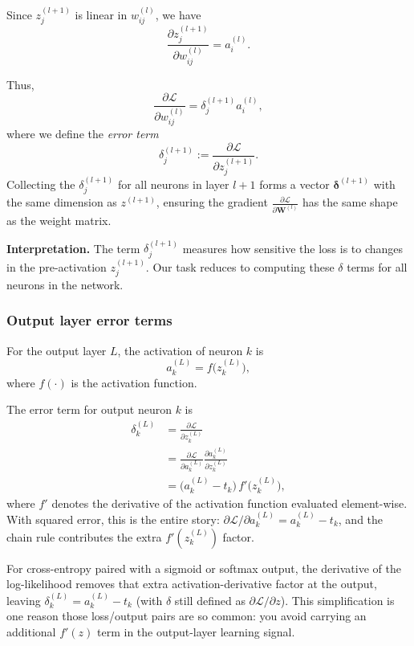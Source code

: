 Since \( z_j^{(l+1)} \) is linear in \( w_{ij}^{(l)} \), we have
\[
\frac{\partial z_j^{(l+1)}}{\partial w_{ij}^{(l)}} = a_i^{(l)}.
\]

Thus,
\begin{equation}
\frac{\partial \mathcal{L}}{\partial w_{ij}^{(l)}} = \delta_j^{(l+1)} a_i^{(l)},
\label{eq:weight_gradient}
\end{equation}
where we define the \emph{error term}
\[
\delta_j^{(l+1)}:= \frac{\partial \mathcal{L}}{\partial z_j^{(l+1)}}.
\]
Collecting the \(\delta_j^{(l+1)}\) for all neurons in layer \(l+1\) forms a vector \(\boldsymbol{\delta}^{(l+1)}\) with the same dimension as \(z^{(l+1)}\), ensuring the gradient \(\frac{\partial \mathcal{L}}{\partial \mathbf{W}^{(l)}}\) has the same shape as the weight matrix.

\smallskip
\noindent\textbf{Interpretation.} The term \(\delta_j^{(l+1)}\) measures how sensitive the loss is to changes in the pre\hyp{}activation \(z_j^{(l+1)}\). Our task reduces to computing these \(\delta\) terms for all neurons in the network.

\subsubsection{Output layer error terms}
\label{sec:backprop_output_layer_error_terms_sub}

For the output layer \( L \), the activation of neuron \( k \) is
\[
a_k^{(L)} = f\big(z_k^{(L)}\big),
\]
where \(f(\cdot)\) is the activation function.

The error term for output neuron \( k \) is
\begin{equation}
\begin{aligned}
\delta_k^{(L)} &= \frac{\partial \mathcal{L}}{\partial z_k^{(L)}} \\
&= \frac{\partial \mathcal{L}}{\partial a_k^{(L)}} \frac{\partial a_k^{(L)}}{\partial z_k^{(L)}} \\
&= \big(a_k^{(L)} - t_k\big) \, f'\big(z_k^{(L)}\big),
\end{aligned}
\label{eq:delta_output}
\end{equation}
where \(f'\) denotes the derivative of the activation function evaluated element-wise. With squared error, this is the
entire story: \(\partial \mathcal{L}/\partial a_k^{(L)} = a_k^{(L)}-t_k\), and the chain rule contributes the extra
\(f'(z_k^{(L)})\) factor.

For cross\hyp{}entropy paired with a sigmoid or softmax output, the derivative of the log-likelihood removes that extra
activation-derivative factor at the output, leaving \(\delta_k^{(L)} = a_k^{(L)}-t_k\) (with \(\delta\) still defined as
\(\partial \mathcal{L}/\partial z\)). This simplification is one reason those loss/output pairs are so common: you avoid
carrying an additional \(f'(z)\) term in the output\hyp{}layer learning signal.

